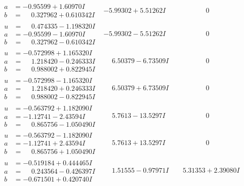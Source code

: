 \documentclass[1p]{elsarticle_modified}
\theoremstyle{definition}
\begin{document}
$$\begin{array}{c|c|c}
\begin{aligned}
a &= -0.95599 + 1.60970 I \\
b &= \phantom{-}0.327962 + 0.610342 I\end{aligned}
 & -5.99302 + 5.51262 I & \phantom{-0.000000 } 0 \\ \hline\begin{aligned}
u &= \phantom{-}0.474335 - 1.198320 I \\
a &= -0.95599 - 1.60970 I \\
b &= \phantom{-}0.327962 - 0.610342 I\end{aligned}
 & -5.99302 - 5.51262 I & \phantom{-0.000000 } 0 \\ \hline\begin{aligned}
u &= -0.572998 + 1.165320 I \\
a &= \phantom{-}1.218420 - 0.246333 I \\
b &= \phantom{-}0.988002 + 0.822945 I\end{aligned}
 & \phantom{-}6.50379 - 6.73509 I & \phantom{-0.000000 } 0 \\ \hline\begin{aligned}
u &= -0.572998 - 1.165320 I \\
a &= \phantom{-}1.218420 + 0.246333 I \\
b &= \phantom{-}0.988002 - 0.822945 I\end{aligned}
 & \phantom{-}6.50379 + 6.73509 I & \phantom{-0.000000 } 0 \\ \hline\begin{aligned}
u &= -0.563792 + 1.182090 I \\
a &= -1.12741 - 2.43594 I \\
b &= \phantom{-}0.865756 - 1.050490 I\end{aligned}
 & \phantom{-}5.7613 - 13.5297 I & \phantom{-0.000000 } 0 \\ \hline\begin{aligned}
u &= -0.563792 - 1.182090 I \\
a &= -1.12741 + 2.43594 I \\
b &= \phantom{-}0.865756 + 1.050490 I\end{aligned}
 & \phantom{-}5.7613 + 13.5297 I & \phantom{-0.000000 } 0 \\ \hline\begin{aligned}
u &= -0.519184 + 0.444465 I \\
a &= \phantom{-}0.243564 - 0.426397 I \\
b &= -0.671501 + 0.420740 I\end{aligned}
 & \phantom{-}1.51555 - 0.97971 I & \phantom{-}5.31353 + 2.39080 I \\ \hline\begin{aligned}

\end{aligned}
\end{array}$$
\end{document}
